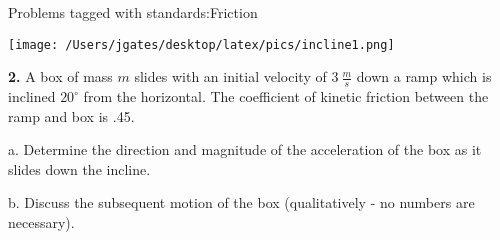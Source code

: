 

{\Large Problems tagged with standards:}Friction
\bigskip 

\begin{floatingfigure}[r]{.25\textwidth}
\texttt{[image: /Users/jgates/desktop/latex/pics/incline1.png]}
\end{floatingfigure} 

{\bf \Large{2.}} A box of mass ${m}$ slides with an initial velocity of ${3~\tfrac{m}{s}}$ down a ramp which is inclined ${20^\circ}$ from the horizontal.  The coefficient of kinetic friction between the ramp and box is .45.

\bigskip

\indent  a. Determine the direction and magnitude of the acceleration of the box as it slides down the incline. 

\vfill

b. Discuss the subsequent motion of the box (qualitatively - no numbers are necessary).

\vspace{25mm}

\newpage